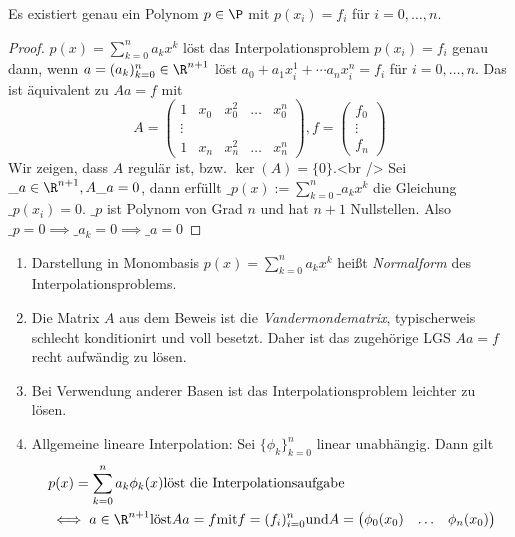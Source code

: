 \documentclass[11pt]{scrartcl}
\begin{document}
\begin{st}
	\label{1.1}
	Es existiert genau ein Polynom $p\in \P$ mit $p(x_i)=f_i$ für $i=0,\dotsc,n$.
	\begin{proof}
		$p(x) = \sum_{k=0}^n a_k x^k$ löst das Interpolationsproblem $p(x_i)=f_i$ genau dann, wenn $a=(a_k)_{k=0}^n \in \R^{n+1}$ löst $a_0 +a_1x_i^1 + \dotsb a_nx_i^n = f_i$ für $i=0,\dotsc,n$.
		Das ist äquivalent zu $Aa=f$ mit
		\[
		A= \begin{pmatrix} 1 & x_0 & x_0^2 & \hdots & x_0^n \\
		\vdots  \\
		1 & x_n & x_n^2 & \hdots & x_n^n\end{pmatrix}, f= \begin{pmatrix}f_0 \\ \vdots \\ f_n\end{pmatrix}
		\]
		Wir zeigen, dass $A$ regulär ist, bzw. $\ker(A) = \{0\}$.<br />
		Sei $\_a \in \R^{n+1}, A\_a=0$, dann erfüllt
		$\_p(x) := \sum_{k=0}^n\_a_k x^k$ die Gleichung $\_p(x_i)=0$.
		$\_p$ ist Polynom von Grad $n$ und hat $n+1$ Nullstellen. Also $\_p=0 \implies \_a_k=0 \implies \_a=0$
	\end{proof}
	\begin{note}
		\begin{enumerate}
			\item 
				Darstellung in Monombasis $p(x)= \sum_{k=0}^n a_kx^k$ heißt \emph{Normalform} des Interpolationsproblems.
			\item
				Die Matrix $A$ aus dem Beweis ist die \emph{Vandermondematrix}, typischerweis schlecht konditionirt und voll besetzt.
				Daher ist das zugehörige LGS $Aa=f$ recht aufwändig zu lösen.
			\item
				Bei Verwendung anderer Basen ist das Interpolationsproblem leichter zu lösen.
			\item
				Allgemeine lineare Interpolation:
				Sei $\{\phi_k\}_{k=0}^n$ linear unabhängig. Dann gilt
				\begin{align*}
					&p(x) = \sum_{k=0}^n a_k \phi_k(x) \text{löst die Interpolationsaufgabe}\\
					&\iff a\in \R^{n+1} \text{löst} Aa=f \text{mit} f=(f_i)_{i=0}^n \text{und} A= \begin{pmatrix}\phi_0(x_0) & \hdots & \phi_n(x_0)\\
					\end{pmatrix}
				\end{align*}
		\end{enumerate}
		
	\end{note}
\end{st}
\end{document}
